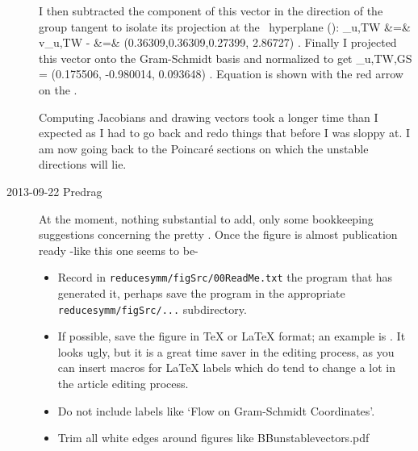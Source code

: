 \begin{description}
	\label{eq:vureqv}
\eea
I then subtracted the component of this vector in the direction of the group tangent
to isolate its projection at the \slice\ hyperplane ():
\bea
	_{u,TW} &=& v_{u,TW} -  
	\continue
		    &=& (0.36309,0.36309,0.27399, 2.86727) .
	\label{eq:vureqvred}
\eea
Finally I projected this vector onto the Gram-Schmidt basis 
and normalized to get
\beq
	_{u,TW,GS} = (0.175506, -0.980014, 0.093648) .
	\label{eq:vureqGS}
\eeq
Equation  is shown with the red arrow on the .

Computing Jacobians and drawing vectors took a longer time than I expected
as I had to go back and redo things that before I was sloppy at. I am now
going back to the Poincar\'e sections on which the unstable directions will lie.

\item[2013-09-22 Predrag]
At the moment, nothing substantial to add, only some bookkeeping
suggestions concerning the pretty . Once
the figure is almost publication ready -like this one seems to be-
\begin{itemize}
  \item Record in \texttt{reducesymm/figSrc/00ReadMe.txt} the program
that has generated it, perhaps save the program in the appropriate
\texttt{reducesymm/figSrc/...} subdirectory.
  \item If possible, save the figure in TeX or LaTeX format; an example
is . It looks ugly, but it is a great time
saver in the editing process, as you can insert macros for LaTeX
labels which do tend to change a lot in the article editing process.
  \item Do not include labels like `Flow on Gram-Schmidt Coordinates'.
  \item Trim all white edges around figures like BBunstablevectors.pdf
\end{itemize}



\end{description}
